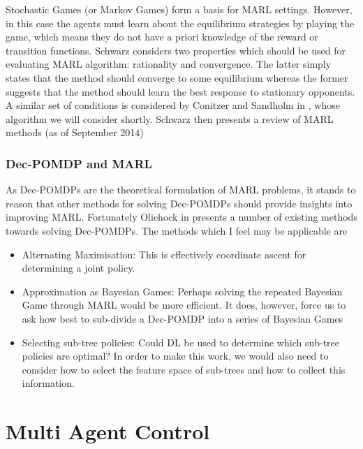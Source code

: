 \documentclass[preprint,11pt]{report}
\begin{document}
Stochastic Games (or Markov Games) form a basis for MARL settings. However, in this case the agents
must learn about the equilibrium strategies by playing the game, which means they do not have a
priori knowledge of the reward or transition functions. Schwarz considers two properties which
should be used for evaluating MARL algorithm: rationality and convergence. The latter simply states
that the method should converge to some equilibrium whereas the former suggests that the method
should learn the best response to stationary opponents. A similar set of conditions is considered by
Conitzer and Sandholm in \cite{ConitzerAWESOME:}, whose algorithm we will consider shortly. Schwarz
then presents a review of MARL methods (as of September 2014) 

\subsection*{Dec-POMDP and MARL}

As Dec-POMDPs are the theoretical formulation of MARL problems, it stands to reason that other
methods for solving Dec-POMDPs should provide insights into improving MARL. Fortunately Oliehock in
\cite{OliehoekDecentralizedPOMDPs} presents a number of existing methods towards solving Dec-POMDPs.
The methods which I feel may be applicable are  \begin{itemize} \item Alternating Maximisation: This
is effectively coordinate ascent for determining a joint policy. \item Approximation as Bayesian
Games: Perhaps solving the repeated Bayesian Game through MARL would be more efficient. It does,
however, force us to ask how best to sub-divide a Dec-POMDP into a series of Bayesian Games  \item
Selecting sub-tree policies: Could DL be used to determine which sub-tree policies are optimal? In
order to make this work, we would also need to consider how to select the feature space of sub-trees
and how to collect this information. \end{itemize}

\chapter{Multi Agent Control}
\end{document}
